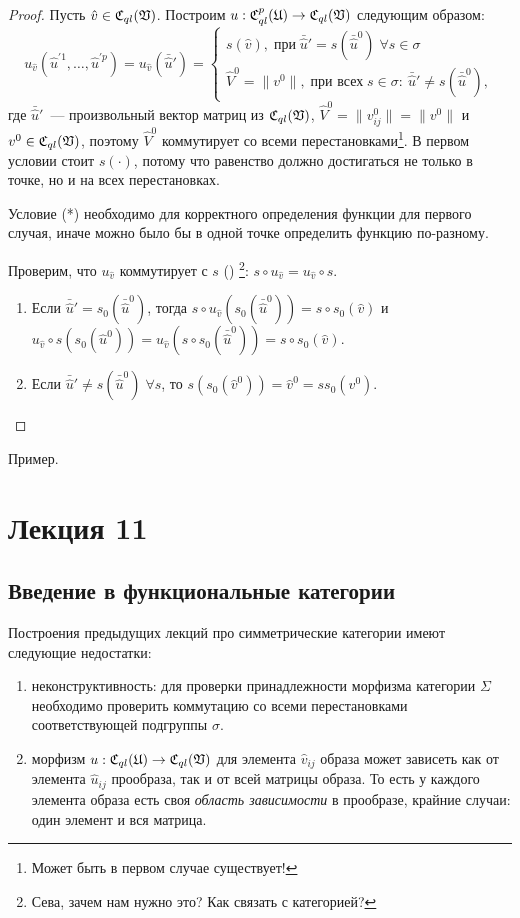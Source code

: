\documentclass[a4paper, 12pt]{report}
\begin{document}
\begin{proof}
Пусть $\hat{v} \in \mathfrak{C}_{ql}(\mathfrak{V})$. Построим $u: \mathfrak{C}_{ql}^p(\mathfrak{U}) \rightarrow \mathfrak{C}_{ql}(\mathfrak{V})$ следующим образом:
\[
u_{\hat{v}}(\hat{u}^{'1}, \ldots, \hat{u}^{'p}) = u_{\hat{v}}(\bar{\hat{u}}') = 
\begin{cases}
s(\hat{v}),\; \text{при} \; \bar{\hat{u}}' = s(\bar{\hat{u}}^0) \; \forall s \in \sigma\\
\hat{V}^0 = \| v^0 \|, \; \text{при всех} \; s \in \sigma: \ \bar{\hat{u}}' \neq s(\bar{\hat{u}}^0),
\end{cases}
\]
где $\bar{\hat{u}}'$~--- произвольный вектор матриц из $\mathfrak{C}_{ql}(\mathfrak{V})$, $\hat{V}^0 = \| v^0_{ij} \| = \| v^0 \|$ и $v^0 \in \mathfrak{C}_{ql}(\mathfrak{V})$, поэтому $\hat{V}^0$ коммутирует со всеми перестановками\footnote{Может быть в первом случае существует!}. В первом условии стоит $s(\cdot)$, потому что равенство должно достигаться не только в точке, но и на всех перестановках.

Условие (*) необходимо для корректного определения функции для первого случая, иначе можно было бы в одной точке определить функцию по-разному.

Проверим, что $u_{\hat{v}}$ коммутирует с $s$ () \footnote{Сева, зачем нам нужно это? Как связать с категорией?}: $s \circ u_{\hat{v}} = u_{\hat{v}} \circ s$.
\begin{enumerate}
\item Если $\bar{\hat{u}}' = s_0(\bar{\hat{u}}^0)$, тогда $s \circ u_{\hat{v}}(s_0(\bar{\hat{u}}^0)) = s \circ s_0(\hat{v})$ и $u_{\hat{v}} \circ s(s_0(\hat{u}^0)) = u_{\hat{v}}(s \circ s_0(\bar{\hat{u}}^0)) = s \circ s_0(\hat{v})$.
\item Если $\bar{\hat{u}}' \neq s(\bar{\hat{u}}^0) \; \forall s$, то $s(s_0(\hat{v}^0)) = \hat{v}^0 = ss_0(v^0)$.
\end{enumerate}
\end{proof}
Пример.

\chapter{Лекция 11}
\section{Введение в функциональные категории}
Построения предыдущих лекций про симметрические категории имеют следующие недостатки:
\begin{enumerate}[1)]
\item неконструктивность: для проверки принадлежности морфизма категории $\Sigma$ необходимо проверить коммутацию со всеми перестановками соответствующей подгруппы $\sigma$.
\item морфизм $u: \mathfrak{C}_{ql}(\mathfrak{U}) \rightarrow \mathfrak{C}_{ql}(\mathfrak{V})$ для элемента $\hat{v}_{ij}$ образа может зависеть как от элемента $\hat{u}_{ij}$ прообраза, так и от всей матрицы образа. То есть у каждого элемента образа есть своя \emph{область зависимости} в прообразе, крайние случаи: один элемент и вся матрица. 
\end{enumerate} 
\end{document}

